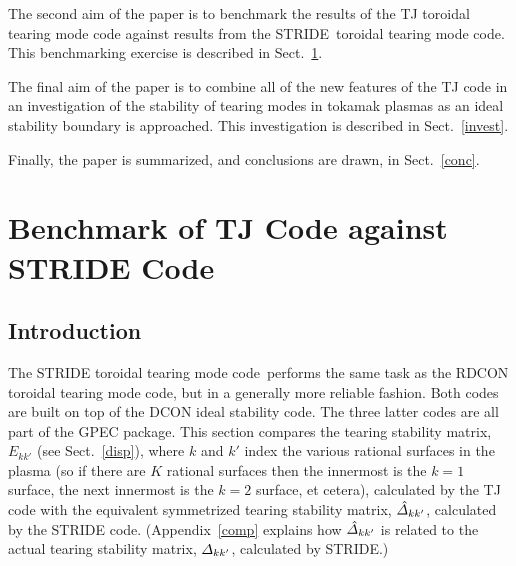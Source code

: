 \documentclass[12pt,prb,aps]{revtex4-1}
\begin{document}
The second aim of the paper is to benchmark the results of the TJ toroidal tearing mode code against results from the STRIDE\,\cite{aglas1} toroidal tearing mode code. This benchmarking
exercise is described in Sect.~\ref{benchmark}. 

The final aim of the paper is to combine all of the new features of the TJ code in an investigation of the stability of tearing modes in tokamak plasmas as
an ideal stability boundary is approached. This investigation is described in Sect.~\ref{invest}.

Finally, the paper is summarized, and conclusions are drawn, in Sect.~\ref{conc}. 

\section{Benchmark of TJ Code against STRIDE Code}\label{benchmark}
\subsection{Introduction}
The STRIDE toroidal tearing mode code\,\cite{aglas1} performs the same task as the RDCON toroidal tearing mode code,\cite{aglas2} but in a generally more reliable fashion. Both codes are built on top of the
DCON ideal stability code.\cite{dcon} The three latter codes are all  part of the GPEC package.\cite{gpec} This section compares the tearing stability matrix, $E_{kk'}$ (see Sect.~\ref{disp}), where $k$ and $k'$ index the various rational surfaces in the
plasma (so if there are $K$ rational surfaces then the innermost is the $k=1$ surface, the next innermost is the $k=2$ surface, et cetera), calculated by the TJ code with the equivalent symmetrized tearing stability matrix, $\hat{\mit\Delta}_{kk'}$, calculated by the STRIDE code. (Appendix~\ref{comp} explains how
$\hat{\mit\Delta}_{kk'}$ is related to the actual tearing stability matrix, ${\mit\Delta}_{kk'}$, calculated by STRIDE.)
\end{document}
